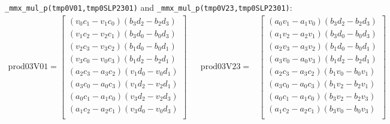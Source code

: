 \documentclass[]{scrartcl}
\newcommand{\pth}[1]{\left(#1\right)}
\begin{document}
\texttt{_mmx_mul_p(tmp0V01,tmp0SLP2301)} and \newline
\texttt{_mmx_mul_p(tmp0V23,tmp0SLP2301)}:
\begin{align*}
\mathrm{prod03V01} 
=
\begin{bmatrix}
\pth{v_0c_1 - v_1c_0}\pth{b_3d_2 - b_2d_3}\\
\pth{v_1c_2 - v_2c_1}\pth{b_3d_0 - b_0d_3}\\
\pth{v_2c_3 - v_3c_2}\pth{b_1d_0 - b_0d_1}\\
\pth{v_3c_0 - v_0c_3}\pth{b_1d_2 - b_2d_1}\\
\pth{a_2c_3 - a_3c_2}\pth{v_1d_0 - v_0d_1}\\
\pth{a_3c_0 - a_0c_3}\pth{v_1d_2 - v_2d_1}\\
\pth{a_0c_1 - a_1c_0}\pth{v_3d_2 - v_2d_3}\\
\pth{a_1c_2 - a_2c_1}\pth{v_3d_0 - v_0d_3}\\
\end{bmatrix}
&&
\mathrm{prod03V23} 
=&
\begin{bmatrix}
\pth{a_0v_1 - a_1v_0}\pth{b_3d_2 - b_2d_3}\\
\pth{a_1v_2 - a_2v_1}\pth{b_3d_0 - b_0d_3}\\
\pth{a_2v_3 - a_3v_2}\pth{b_1d_0 - b_0d_1}\\
\pth{a_3v_0 - a_0v_3}\pth{b_1d_2 - b_2d_1}\\
\pth{a_2c_3 - a_3c_2}\pth{b_1v_0 - b_0v_1}\\
\pth{a_3c_0 - a_0c_3}\pth{b_1v_2 - b_2v_1}\\
\pth{a_0c_1 - a_1c_0}\pth{b_3v_2 - b_2v_3}\\
\pth{a_1c_2 - a_2c_1}\pth{b_3v_0 - b_0v_3}\\
\end{bmatrix}
\end{align*}
\end{document}

